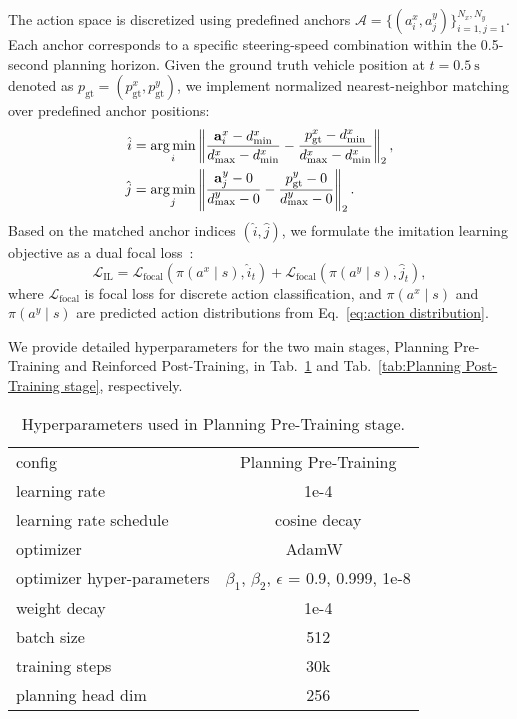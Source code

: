 The action space is discretized using predefined anchors $\mathcal{A} = \{(a^x_i, a^y_j)\}_{i=1,j=1}^{N_x,N_y}$. Each anchor corresponds to a specific steering-speed combination within the 0.5-second planning horizon. Given the ground truth vehicle position at $t=0.5\ \text{s}$ denoted as $p_\text{gt} = (p_\text{gt}^x, p_\text{gt}^y)$, we implement normalized nearest-neighbor matching over predefined anchor positions:
\begin{equation}
\begin{aligned}
\hat{i} &= \operatorname*{arg\,min}_{i} \left\| \frac{\mathbf{a}^x_i - d^x_{\text{min}}}{d^x_{\text{max}}-d^x_{\text{min}}} - \frac{p_\text{gt}^x - d^x_{\text{min}}}{d^x_{\text{max}}-d^x_{\text{min}}} \right\|_2 ,\\
\hat{j} &= \operatorname*{arg\,min}_{j} \left\| \frac{\mathbf{a}^y_j - 0}{d^y_{\text{max}}-0} - \frac{p_\text{gt}^y - 0}{d^y_{\text{max}}-0} \right\|_2 .
\end{aligned}
\label{eq:anchor_matching}
\end{equation}
Based on the matched anchor indices $(\hat{i}, \hat{j})$, we formulate the imitation learning objective as a dual focal loss~\cite{lin2017focal}:
\begin{equation}
\mathcal{L}_\text{IL} = \mathcal{L}_\text{focal}(\pi(a^x\mid s), \hat{i}_t) + \mathcal{L}_\text{focal}(\pi(a^y\mid s), \hat{j}_t) ,
\end{equation}
where $\mathcal{L}_\text{focal}$ is focal loss for discrete action classification, and $\pi(a^x\mid s)$ and $\pi(a^y\mid s)$ are predicted action distributions from Eq.~\ref{eq:action distribution}.

 We provide detailed hyperparameters for the two main stages, Planning Pre-Training and Reinforced Post-Training, in Tab.~\ref{tab:Planning Pre-Training stage} and Tab.~\ref{tab:Planning Post-Training stage}, respectively.

\begin{table}[h]
\centering
{}
\begin{tabular}{l|c}
config &Planning Pre-Training \\
\shline
learning rate & 1e-4 \\
learning rate schedule & cosine decay \\
optimizer & AdamW~\cite{adam,Loshchilov2019adamw} \\
optimizer hyper-parameters & $\beta_1$, $\beta_2$, $\epsilon$ = 0.9, 0.999, 1e-8 \\
weight decay & 1e-4 \\
batch size & 512 \\
training steps & 30k \\
planning head dim & 256 \\
\end{tabular}
\caption{Hyperparameters used in \thename{} Planning Pre-Training stage.}
\label{tab:Planning Pre-Training stage}    
\end{table}


